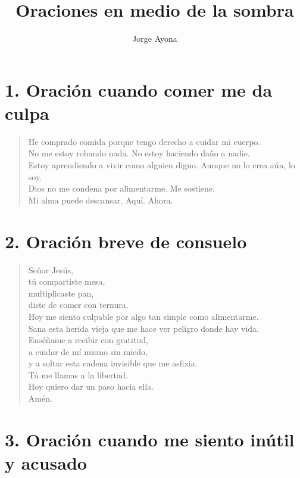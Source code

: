 \documentclass[12pt]{article}
\title{\textbf{Oraciones en medio de la sombra}}
\author{Jorge Ayona}
\date{}
\begin{document}
	\maketitle
	
	\section*{1. Oración cuando comer me da culpa}
	
	\begin{verse}
		He comprado comida porque tengo derecho a cuidar mi cuerpo.\\
		No me estoy robando nada. No estoy haciendo daño a nadie.\\
		Estoy aprendiendo a vivir como alguien digno. Aunque no lo crea aún, lo soy.\\
		Dios no me condena por alimentarme. Me sostiene.\\
		Mi alma puede descansar. Aquí. Ahora.
	\end{verse}
	
	\section*{2. Oración breve de consuelo}
	
	\begin{verse}
		Señor Jesús,\\
		tú compartiste mesa,\\
		multiplicaste pan,\\
		diste de comer con ternura.\\
		
		Hoy me siento culpable por algo tan simple como alimentarme.\\
		Sana esta herida vieja que me hace ver peligro donde hay vida.\\
		
		Enséñame a recibir con gratitud,\\
		a cuidar de mí mismo sin miedo,\\
		y a soltar esta cadena invisible que me asfixia.\\
		
		Tú me llamas a la libertad.\\
		Hoy quiero dar un paso hacia ella.\\
		Amén.
	\end{verse}
	
	\section*{3. Oración cuando me siento inútil y acusado}
	
\end{document}
